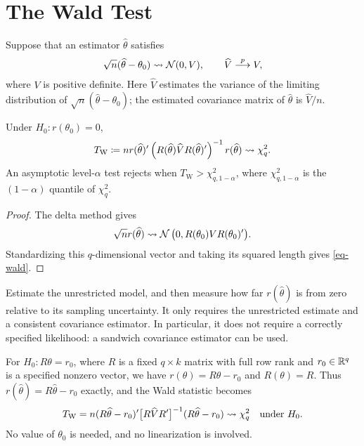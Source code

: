 \documentclass[a4paper,12pt]{article}
\begin{document}
\section{The Wald Test}

Suppose that an estimator $\widehat\theta$ satisfies
\begin{align}
	\sqrt n(\widehat\theta-\theta_0)\overset{}{\leadsto}\operatorname{\mathcal{N}}(0,V),
	\qquad \widehat V\overset{p}{\longrightarrow} V,
\end{align}
where $V$ is positive definite.
Here $\widehat V$ estimates the variance of the limiting distribution of
$\sqrt n(\widehat\theta-\theta_0)$; the estimated covariance matrix of $\widehat\theta$ is $\widehat V/n$.

\begin{theorem}\label{prop-wald}
	Under $H_0:r(\theta_0)=0$,
	\begin{align}
		T_{\mathrm W}
		\coloneqq n r(\widehat\theta)^{\prime}
		\left(R(\widehat\theta)\widehat V R(\widehat\theta)^{\prime}\right)^{-1}
		r(\widehat\theta)
		\overset{}{\leadsto}\chi_q^2.\label{eq-wald}
	\end{align}
	An asymptotic level-$\alpha$ test rejects when $T_{\mathrm W}>\chi^2_{q,1-\alpha}$,
	where $\chi^2_{q,1-\alpha}$ is the $(1-\alpha)$ quantile of $\chi_q^2$.
\end{theorem}
\begin{proof}
	The delta method gives
	\begin{align}
		\sqrt n r(\widehat\theta)
		\overset{}{\leadsto}\operatorname{\mathcal{N}}\big(0,R(\theta_0)VR(\theta_0)^{\prime}\big).
	\end{align}
	Standardizing this $q$-dimensional vector and taking its squared length gives \eqref{eq-wald}.
\end{proof}

\begin{remark}[Interpretation]
	Estimate the unrestricted model, and then measure how far $r(\widehat\theta)$ is from zero relative to its sampling uncertainty.
	It only requires the unrestricted estimate and a consistent covariance estimator.
	In particular, it does not require a correctly specified likelihood: a sandwich covariance estimator can be used.
\end{remark}

\begin{remark}
	For $H_0:R\theta=r_0$, where $R$ is a fixed $q\times k$ matrix with full row rank and $r_0\in\mathbb{R}^q$ is a specified nonzero vector,
	we have $r(\theta)=R\theta-r_0$ and $R(\theta)=R$.
	Thus $r(\widehat\theta)=R\widehat\theta-r_0$ exactly, and the Wald statistic becomes
	\begin{align}
		T_{\mathrm W}
		=n(R\widehat\theta-r_0)^{\prime}\big[R\widehat V R^{\prime}\big]^{-1}(R\widehat\theta-r_0)
		\overset{}{\leadsto}\chi_q^2\quad\text{under }H_0.
	\end{align}
	No value of $\theta_0$ is needed, and no linearization is involved.
\end{remark}
\end{document}
